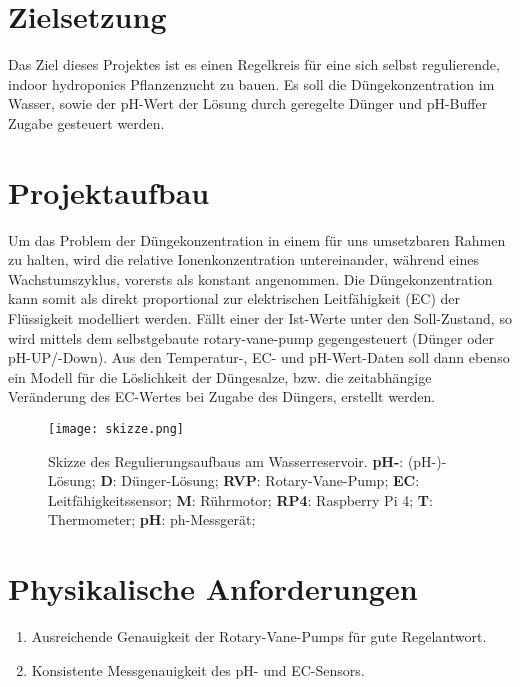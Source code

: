 
\section*{Zielsetzung}
Das Ziel dieses Projektes ist es einen Regelkreis für eine sich selbst regulierende, indoor hydroponics Pflanzenzucht zu bauen.
Es soll die Düngekonzentration im Wasser, sowie der pH-Wert der Lösung durch geregelte Dünger und pH-Buffer Zugabe gesteuert werden.

\section*{Projektaufbau}
Um das Problem der Düngekonzentration in einem für uns umsetzbaren Rahmen zu halten, wird die relative Ionenkonzentration untereinander, während eines Wachstumszyklus, vorersts als konstant angenommen.
Die Düngekonzentration kann somit als direkt proportional zur elektrischen Leitfähigkeit (EC) der Flüssigkeit modelliert werden.
Fällt einer der Ist-Werte unter den Soll-Zustand, so wird mittels dem selbstgebaute rotary-vane-pump gegengesteuert (Dünger oder pH-UP/-Down).
Aus den Temperatur-, EC- und pH-Wert-Daten soll dann ebenso ein Modell für die Löslichkeit der Düngesalze, bzw. die zeitabhängige Veränderung des EC-Wertes bei Zugabe des Düngers, erstellt werden.

\begin{figure}[H]
    \centering
    \texttt{[image: skizze.png]}
    \caption{
        Skizze des Regulierungsaufbaus am Wasserreservoir.
        \textbf{pH-}: (pH-)-Lösung; 
        \textbf{D}: Dünger-Lösung; 
        \textbf{RVP}: Rotary-Vane-Pump; 
        \textbf{EC}: Leitfähigkeitssensor; 
        \textbf{M}: Rührmotor; 
        \textbf{RP4}: Raspberry Pi 4; 
        \textbf{T}: Thermometer; 
        \textbf{pH}: ph-Messgerät;
    }
\end{figure}

\section*{Physikalische Anforderungen}
\begin{enumerate}
    \item Ausreichende Genauigkeit der Rotary-Vane-Pumps für gute Regelantwort.
    \item Konsistente Messgenauigkeit des pH- und EC-Sensors.
\end{enumerate}


